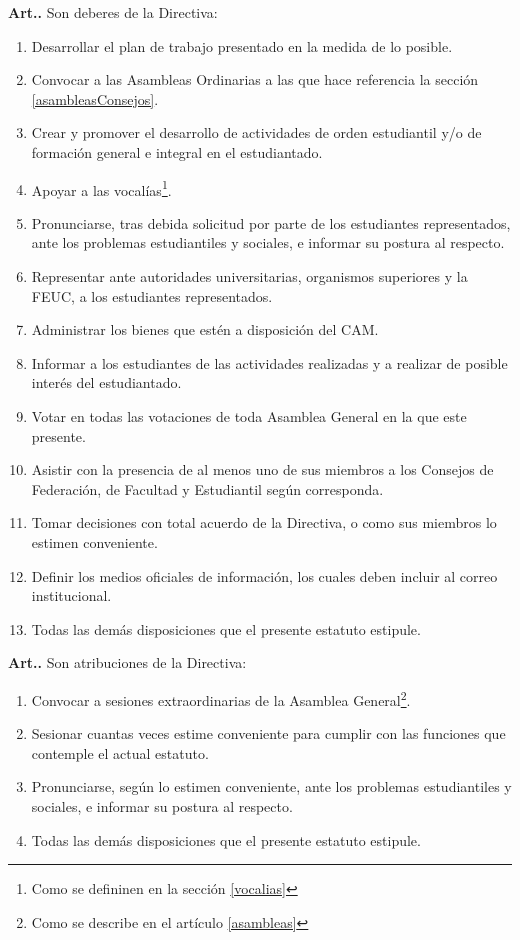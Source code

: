 \documentclass[letterpaper,11pt]{article}
\newcounter{art}
\newenvironment{art}{\refstepcounter{art}\mbox{\textbf{Art.{\space}\theart.}}\ignorespaces}{}
\begin{document}
\begin{art}\label{deberesDirectiva}
    Son deberes de la Directiva:
    \begin{enumerate}
        \item Desarrollar el plan de trabajo presentado en la medida de lo posible.
        \item Convocar a las Asambleas Ordinarias a las que hace referencia la sección \ref{asambleasConsejos}.
        \item Crear y promover el desarrollo de actividades de orden estudiantil y/o de formación general e integral en el estudiantado.
        \item Apoyar a las vocalías\footnote{Como se defininen en la sección \ref{vocalias}}.
        \item Pronunciarse, tras debida solicitud por parte de los estudiantes representados, ante los problemas estudiantiles y sociales, e informar su postura al respecto.
        \item Representar ante autoridades universitarias, organismos superiores y la FEUC, a los estudiantes representados.
        \item Administrar los bienes que estén a disposición del CAM.
        \item Informar a los estudiantes de las actividades realizadas y a realizar de posible interés del estudiantado.
        \item Votar en todas las votaciones de toda Asamblea General en la que este presente.
        \item Asistir con la presencia de al menos uno de sus miembros a los Consejos de Federación, de Facultad y Estudiantil según corresponda.
        \item Tomar decisiones con total acuerdo de la Directiva, o como sus miembros lo estimen conveniente.
        \item Definir los medios oficiales de información, los cuales deben incluir al correo institucional.
        \item Todas las demás disposiciones que el presente estatuto estipule.
    \end{enumerate}
\end{art}

\begin{art}\label{atribucionesDirectiva}
    Son atribuciones de la Directiva:
    \begin{enumerate}
        \item Convocar a sesiones extraordinarias de la Asamblea General\footnote{Como se describe en el artículo \ref{asambleas}}.
        \item Sesionar cuantas veces estime conveniente para cumplir con las funciones que contemple el actual estatuto.
        \item Pronunciarse, según lo estimen conveniente, ante los problemas estudiantiles y sociales, e informar su postura al respecto.
        \item Todas las demás disposiciones que el presente estatuto estipule.
    \end{enumerate}
\end{art}
\end{document}
